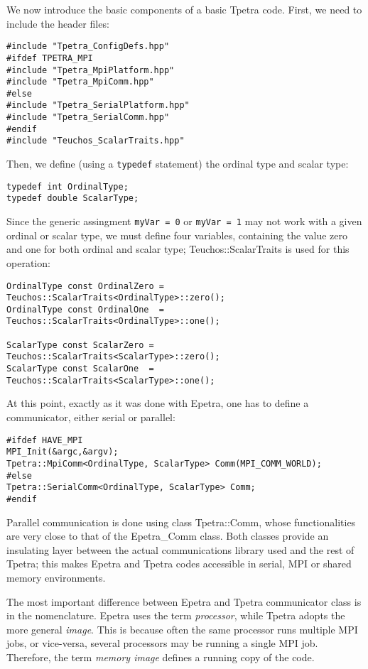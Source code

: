 We now introduce the basic components of a basic Tpetra code. First, we need
to include the header files:
\begin{verbatim}
#include "Tpetra_ConfigDefs.hpp"
#ifdef TPETRA_MPI
#include "Tpetra_MpiPlatform.hpp"
#include "Tpetra_MpiComm.hpp"
#else
#include "Tpetra_SerialPlatform.hpp"
#include "Tpetra_SerialComm.hpp"
#endif
#include "Teuchos_ScalarTraits.hpp"
\end{verbatim}
Then, we define (using a {\tt typedef} statement) the ordinal type and scalar type:
\begin{verbatim}
typedef int OrdinalType;
typedef double ScalarType;
\end{verbatim}
Since the generic assingment \verb!myVar = 0! or \verb!myVar = 1! may not work
with a given ordinal or scalar type, we must define four variables, containing
the value zero and one for both ordinal and scalar type; Teuchos::ScalarTraits
is used for this operation:
\begin{verbatim}
OrdinalType const OrdinalZero = Teuchos::ScalarTraits<OrdinalType>::zero();
OrdinalType const OrdinalOne  = Teuchos::ScalarTraits<OrdinalType>::one();

ScalarType const ScalarZero = Teuchos::ScalarTraits<ScalarType>::zero();
ScalarType const ScalarOne  = Teuchos::ScalarTraits<ScalarType>::one();
\end{verbatim}
At this point, exactly as it was done with Epetra, one has to define a 
communicator, either serial or parallel:
\begin{verbatim}
#ifdef HAVE_MPI
MPI_Init(&argc,&argv);
Tpetra::MpiComm<OrdinalType, ScalarType> Comm(MPI_COMM_WORLD);
#else
Tpetra::SerialComm<OrdinalType, ScalarType> Comm;
#endif
\end{verbatim}
Parallel communication is done using class Tpetra::Comm, whose
functionalities are very close to that of the Epetra\_Comm class.  Both
classes provide
an insulating layer between the actual communications library used and the
rest of Tpetra; this makes Epetra and Tpetra codes accessible in serial, MPI
or shared memory environments.

The most important difference between Epetra and Tpetra communicator class is
in the nomenclature. Epetra uses the term {\sl processor}, while Tpetra adopts
the more general {\sl image}. This is because often the same processor runs
multiple MPI jobs, or vice-versa, several processors may be running a single
MPI job. Therefore, the term {\sl memory image} defines a running copy of the
code.

